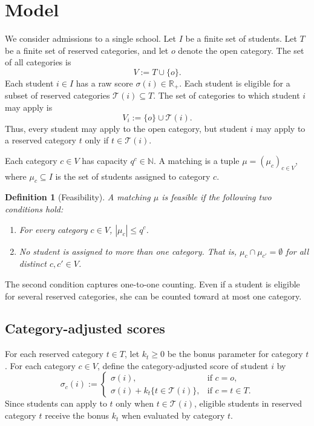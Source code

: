 \documentclass[10pt]{article}
\newtheorem{definition}{Definition}
\newcommand{\T}{\mathcal{T}}
\newcommand{\R}{\mathbb{R}}
\newcommand{\1}{\mathbf{1}}
\begin{document}
\section{Model}

We consider admissions to a single school. Let $I$ be a finite set of students. Let $T$ be a finite set of reserved categories, and let $o$ denote the open category. The set of all categories is
\[
V := T \cup \{o\}.
\]
Each student $i\in I$ has a raw score $\sigma(i)\in\R_+$. Each student is eligible for a subset of reserved categories $\T(i)\subseteq T$. The set of categories to which student $i$ may apply is
\[
V_i := \{o\}\cup \T(i).
\]
Thus, every student may apply to the open category, but student $i$ may apply to a reserved category $t$ only if $t\in\T(i)$.

Each category $c\in V$ has capacity $q^c\in\mathbb{N}$. A matching is a tuple $\mu=(\mu_c)_{c\in V}$, where $\mu_c\subseteq I$ is the set of students assigned to category $c$.

\begin{definition}[Feasibility]
A matching $\mu$ is feasible if the following two conditions hold:
\begin{enumerate}
\item For every category $c\in V$, $|\mu_c|\le q^c$.
\item No student is assigned to more than one category. That is, $\mu_c\cap \mu_{c'}=\emptyset$ for all distinct $c,c'\in V$.
\end{enumerate}
\end{definition}

The second condition captures one-to-one counting. Even if a student is eligible for several reserved categories, she can be counted toward at most one category.

\subsection{Category-adjusted scores}

For each reserved category $t\in T$, let $k_t\ge 0$ be the bonus parameter for category $t$. For each category $c\in V$, define the category-adjusted score of student $i$ by
\[
\sigma_c(i)
:=
\begin{cases}
\sigma(i), & \text{if } c=o,\\[3pt]
\sigma(i)+k_t\{t\in\T(i)\}, & \text{if } c=t\in T.
\end{cases}
\]
Since students can apply to $t$ only when $t\in\T(i)$, eligible students in reserved category $t$ receive the bonus $k_t$ when evaluated by category $t$.
\end{document}

